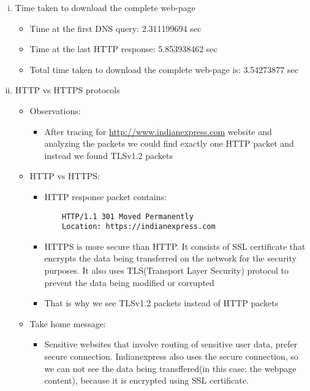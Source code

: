 \documentclass{article}
\begin{document}
\begin{enumerate}[a)]
\begin{enumerate}[i)]
\begin{itemize}
                    \end{itemize}{}
                \item Time taken to download the complete web-page
                    \begin{itemize}
                        \item Time at the first DNS query: 2.311199694 sec
                        \item Time at the last HTTP response: 5.853938462 sec
                        \item Total time taken to download the complete web-page is: 3.54273877 sec
                    \end{itemize}{}
                \item HTTP vs HTTPS protocols
                    \begin{itemize}
                        \item Observations:
                            \begin{itemize}
                                \item After tracing for \href{http://www.indianexpress.com}{http://www.indianexpress.com} website and analyzing the packets we could find exactly one HTTP packet and instead we found TLSv1.2 packets
                            \end{itemize}{}
                        \item HTTP vs HTTPS:
                            \begin{itemize}
                                \item HTTP response packet contains:
                                    \begin{lstlisting}    
    HTTP/1.1 301 Moved Permanently
    Location: https://indianexpress.com
                                    \end{lstlisting}
                                \item HTTPS is more secure than HTTP. It consists of SSL certificate that encrypts the data being transferred on the network for the security purposes. It also uses TLS(Transport Layer Security) protocol to prevent the data being modified or corrupted
                                \item That is why we see TLSv1.2 packets instead of HTTP packets
                            \end{itemize}{}
                        \item Take home message:
                            \begin{itemize}
                                \item Sensitive websites that involve routing of sensitive user data, prefer secure connection. Indianexpress also uses the secure connection, so we can not see the data being transffered(in this case: the webpage content), because it is encrypted using SSL certificate.
                            \end{itemize}{}
                    \end{itemize}{}
            \end{enumerate}{}
    \end{enumerate}
\end{document}

